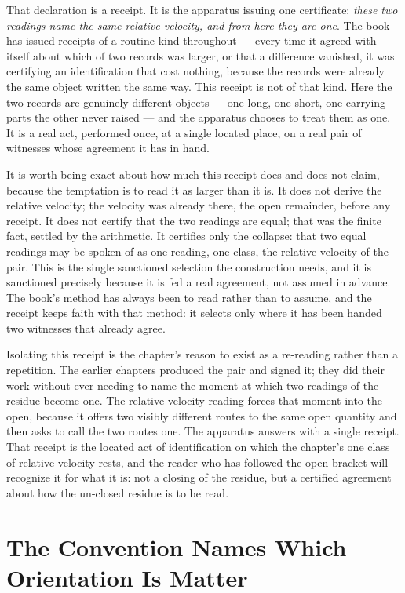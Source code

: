 That declaration is a receipt. It is the apparatus issuing one certificate: \emph{these two
readings name the same relative velocity, and from here they are one}. The book has issued
receipts of a routine kind throughout --- every time it agreed with itself about which of two
records was larger, or that a difference vanished, it was certifying an identification that cost
nothing, because the records were already the same object written the same way. This receipt is
not of that kind. Here the two records are genuinely different objects --- one long, one short,
one carrying parts the other never raised --- and the apparatus chooses to treat them as one. It
is a real act, performed once, at a single located place, on a real pair of witnesses whose
agreement it has in hand.

It is worth being exact about how much this receipt does and does not claim, because the
temptation is to read it as larger than it is. It does not derive the relative velocity; the
velocity was already there, the open remainder, before any receipt. It does not certify that the
two readings are equal; that was the finite fact, settled by the arithmetic. It certifies only the
collapse: that two equal readings may be spoken of as one reading, one class, the relative
velocity of the pair. This is the single sanctioned selection the construction needs, and it is
sanctioned precisely because it is fed a real agreement, not assumed in advance. The book's method
has always been to read rather than to assume, and the receipt keeps faith with that method: it
selects only where it has been handed two witnesses that already agree.

Isolating this receipt is the chapter's reason to exist as a re-reading rather than a repetition.
The earlier chapters produced the pair and signed it; they did their work without ever needing to
name the moment at which two readings of the residue become one. The relative-velocity reading
forces that moment into the open, because it offers two visibly different routes to the same open
quantity and then asks to call the two routes one. The apparatus answers with a single receipt.
That receipt is the located act of identification on which the chapter's one class of relative
velocity rests, and the reader who has followed the open bracket will recognize it for what it is:
not a closing of the residue, but a certified agreement about how the un-closed residue is to be
read.

\section{The Convention Names Which Orientation Is Matter}

